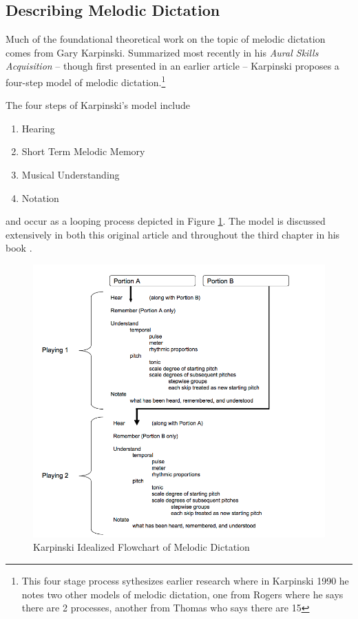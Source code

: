 \documentclass[]{book}
\providecommand{\tightlist}{%
  \setlength{\itemsep}{0pt}\setlength{\parskip}{0pt}}
\let\rmarkdownfootnote\footnote%
\def\footnote{\protect\rmarkdownfootnote}
\begin{document}
\hypertarget{describing-melodic-dictation}{%
\subsection{Describing Melodic Dictation}\label{describing-melodic-dictation}}

Much of the foundational theoretical work on the topic of melodic dictation comes from Gary Karpinski.
Summarized most recently in his \emph{Aural Skills Acquisition} \citep{karpinskiAuralSkillsAcquisition2000}-- though first presented in an earlier article \citep{karpinskiModelMusicPerception1990}-- Karpinski proposes a four-step model of melodic dictation.\footnote{This four stage process sythesizes earlier research where in Karpinski 1990 he notes two other models of melodic dictation, one from Rogers where he says there are 2 processes, another from Thomas who says there are 15}

The four steps of Karpinski's model include

\begin{enumerate}
\def\labelenumi{\arabic{enumi}.}
\tightlist
\item
  Hearing
\item
  Short Term Melodic Memory
\item
  Musical Understanding
\item
  Notation
\end{enumerate}

and occur as a looping process depicted in Figure \ref{fig:flowchart}.
The model is discussed extensively in both this original article \citep{karpinskiModelMusicPerception1990} and throughout the third chapter in his book \citep{karpinskiAuralSkillsAcquisition2000}.

\begin{figure}

{\centering \includegraphics[width=1\linewidth]{img/karpinski31} 

}

\caption{Karpinski Idealized Flowchart of Melodic Dictation}\label{fig:flowchart}
\end{figure}
\end{document}
